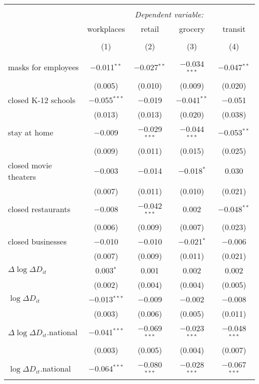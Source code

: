 \begin{tabular}{@{\extracolsep{1pt}}lcccc} 
\\[-1.8ex]\hline 
\hline \\[-1.8ex] 
 & \multicolumn{4}{c}{\textit{Dependent variable:}} \\ 
\cline{2-5} 
 & workplaces & retail & grocery & transit \\ 
\\[-1.8ex] & (1) & (2) & (3) & (4)\\ 
\hline \\[-1.8ex] 
 masks for employees & $-$0.011$^{**}$ & $-$0.027$^{**}$ & $-$0.034$^{***}$ & $-$0.047$^{**}$ \\ 
  & (0.005) & (0.010) & (0.009) & (0.020) \\ 
  closed K-12 schools & $-$0.055$^{***}$ & $-$0.019 & $-$0.041$^{**}$ & $-$0.051 \\ 
  & (0.013) & (0.013) & (0.020) & (0.038) \\ 
  stay at home & $-$0.009 & $-$0.029$^{***}$ & $-$0.044$^{***}$ & $-$0.053$^{**}$ \\ 
  & (0.009) & (0.011) & (0.015) & (0.025) \\ 
  closed movie theaters & $-$0.003 & $-$0.014 & $-$0.018$^{*}$ & 0.030 \\ 
  & (0.007) & (0.011) & (0.010) & (0.021) \\ 
  closed restaurants & $-$0.008 & $-$0.042$^{***}$ & 0.002 & $-$0.048$^{**}$ \\ 
  & (0.006) & (0.009) & (0.007) & (0.023) \\ 
  closed businesses & $-$0.010 & $-$0.010 & $-$0.021$^{*}$ & $-$0.006 \\ 
  & (0.007) & (0.009) & (0.011) & (0.021) \\ 
  $\Delta \log \Delta D_{it}$ & 0.003$^{*}$ & 0.001 & 0.002 & 0.002 \\ 
  & (0.002) & (0.004) & (0.004) & (0.005) \\ 
  $\log \Delta D_{it}$ & $-$0.013$^{***}$ & $-$0.009 & $-$0.002 & $-$0.008 \\ 
  & (0.003) & (0.006) & (0.005) & (0.011) \\ 
  $\Delta \log \Delta D_{it}$.national & $-$0.041$^{***}$ & $-$0.069$^{***}$ & $-$0.023$^{***}$ & $-$0.048$^{***}$ \\ 
  & (0.003) & (0.005) & (0.004) & (0.007) \\ 
  $\log \Delta D_{it}$.national & $-$0.064$^{***}$ & $-$0.080$^{***}$ & $-$0.028$^{***}$ & $-$0.067$^{***}$ \\ 

\end{tabular}
